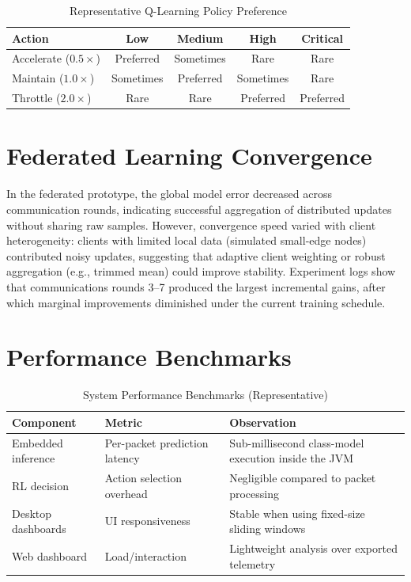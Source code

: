 \begin{table}[H]
\centering
\caption{Representative Q-Learning Policy Preference}
\label{tab:qtable}
\begin{tabular}{@{}lcccc@{}}
\toprule
\textbf{Action} & \textbf{Low} & \textbf{Medium} & \textbf{High} & \textbf{Critical} \\
\midrule
Accelerate ($0.5\times$) & Preferred & Sometimes & Rare & Rare \\
Maintain ($1.0\times$) & Sometimes & Preferred & Sometimes & Rare \\
Throttle ($2.0\times$) & Rare & Rare & Preferred & Preferred \\
\bottomrule
\end{tabular}
\end{table}

\section{Federated Learning Convergence}

In the federated prototype, the global model error decreased across communication rounds, indicating successful aggregation of distributed updates without sharing raw samples. However, convergence speed varied with client heterogeneity: clients with limited local data (simulated small-edge nodes) contributed noisy updates, suggesting that adaptive client weighting or robust aggregation (e.g., trimmed mean) could improve stability. Experiment logs show that communications rounds 3--7 produced the largest incremental gains, after which marginal improvements diminished under the current training schedule.

\section{Performance Benchmarks}

\begin{table}[H]
\centering
\caption{System Performance Benchmarks (Representative)}
\label{tab:benchmarks}
\begin{tabularx}{\textwidth}{@{}lXX@{}}
\toprule
\textbf{Component} & \textbf{Metric} & \textbf{Observation} \\
\midrule
Embedded inference & Per-packet prediction latency & Sub-millisecond class-model execution inside the JVM \\
RL decision & Action selection overhead & Negligible compared to packet processing \\
Desktop dashboards & UI responsiveness & Stable when using fixed-size sliding windows \\
Web dashboard & Load/interaction & Lightweight analysis over exported telemetry \\
\bottomrule
\end{tabularx}
\end{table}

